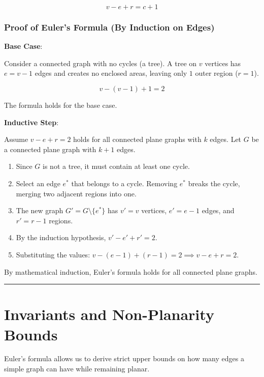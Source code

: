 \documentclass[
]{book}
\providecommand{\tightlist}{%
  \setlength{\itemsep}{0pt}\setlength{\parskip}{0pt}}
\theoremstyle{definition}
\theoremstyle{definition}
\theoremstyle{definition}
\theoremstyle{definition}
\theoremstyle{remark}
\begin{document}
\[v - e + r = c + 1\]

\subsubsection{Proof of Euler's Formula (By Induction on Edges)}\label{proof-of-eulers-formula-by-induction-on-edges}

\textbf{Base Case}:

Consider a connected graph with no cycles (a tree). A tree on \(v\) vertices has \(e = v - 1\) edges and creates no enclosed areas, leaving only \(1\) outer region (\(r = 1\)).

\[v - (v - 1) + 1 = 2\]

The formula holds for the base case.

\textbf{Inductive Step}:

Assume \(v - e + r = 2\) holds for all connected plane graphs with \(k\) edges. Let \(G\) be a connected plane graph with \(k + 1\) edges.

\begin{enumerate}
\def\labelenumi{\arabic{enumi}.}
\tightlist
\item
  Since \(G\) is not a tree, it must contain at least one cycle.
\item
  Select an edge \(e^*\) that belongs to a cycle. Removing \(e^*\) breaks the cycle, merging two adjacent regions into one.
\item
  The new graph \(G' = G \setminus \{e^*\}\) has \(v'=v\) vertices, \(e'=e-1\) edges, and \(r'=r-1\) regions.
\item
  By the induction hypothesis, \(v' - e' + r' = 2\).
\item
  Substituting the values: \(v - (e - 1) + (r - 1) = 2 \implies v - e + r = 2\).
\end{enumerate}

By mathematical induction, Euler's formula holds for all connected plane graphs.

\begin{center}\rule{0.5\linewidth}{0.5pt}\end{center}

\section{Invariants and Non-Planarity Bounds}\label{invariants-and-non-planarity-bounds}

Euler's formula allows us to derive strict upper bounds on how many edges a simple graph can have while remaining planar.
\end{document}

